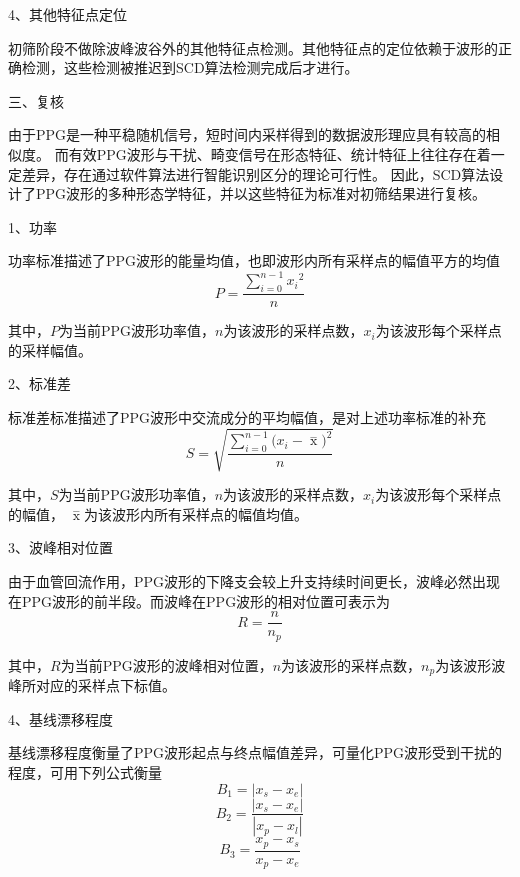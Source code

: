 4、其他特征点定位

初筛阶段不做除波峰波谷外的其他特征点检测。其他特征点的定位依赖于波形的正确检测，这些检测被推迟到SCD算法检测完成后才进行。

三、复核

由于PPG是一种平稳随机信号，短时间内采样得到的数据波形理应具有较高的相似度\cite{Qiu2012}。
而有效PPG波形与干扰、畸变信号在形态特征、统计特征上往往存在着一定差异，存在通过软件算法进行智能识别区分的理论可行性。
因此，SCD算法设计了PPG波形的多种形态学特征，并以这些特征为标准对初筛结果进行复核。

1、功率

功率标准描述了PPG波形的能量均值，也即波形内所有采样点的幅值平方的均值
\begin{equation}
    \label{equ:ppgp}
    P=\frac{\sum_{i=0}^{n-1}{x_i}^2}{n}
\end{equation}

其中，$P$为当前PPG波形功率值，$n$为该波形的采样点数，$x_i$为该波形每个采样点的采样幅值。

2、标准差

标准差标准描述了PPG波形中交流成分的平均幅值，是对上述功率标准的补充
\begin{equation}
    \label{equ:ppgstd}
    S=\sqrt{\frac{\sum_{i=0}^{n-1}{(x_i-\mathop{x} \limits^-})^2}{n}}
\end{equation}

其中，$S$为当前PPG波形功率值，$n$为该波形的采样点数，$x_i$为该波形每个采样点的幅值， $\mathop{x} \limits^-$为该波形内所有采样点的幅值均值。

3、波峰相对位置 

由于血管回流作用，PPG波形的下降支会较上升支持续时间更长，波峰必然出现在PPG波形的前半段。而波峰在PPG波形的相对位置可表示为
\begin{equation}
    \label{equ:rpeak}
    R = \frac{n}{n_p}
\end{equation}

其中，$R$为当前PPG波形的波峰相对位置，$n$为该波形的采样点数，$n_p$为该波形波峰所对应的采样点下标值。

4、基线漂移程度 

基线漂移程度衡量了PPG波形起点与终点幅值差异，可量化PPG波形受到干扰的程度，可用下列公式衡量
\begin{equation}
    \label{equ:b1}
    B_1 = |x_s-x_e|
\end{equation}
\begin{equation}
    \label{equ:b2}
    B_2 = \frac{|x_s-x_e|}{|x_p-x_l|}
\end{equation}
\begin{equation}
    \label{equ:b3}
    B_3 = \frac{x_p-x_s}{x_p-x_e}
\end{equation}

